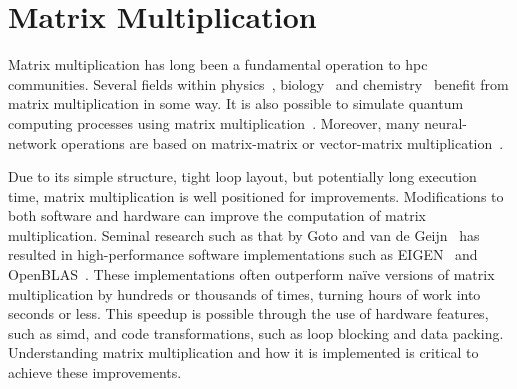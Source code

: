 \documentclass[\main/thesis.tex]{subfiles}
\begin{document}
\chapter{Matrix Multiplication}
\label{cha:matmul}
Matrix multiplication has long been a fundamental operation to \gls{hpc} communities.
Several fields within physics~\autocite{krol2014matrix}, biology~\autocite{akutsu2000algorithms} and chemistry~\autocite{weber2015semiempirical} benefit from matrix multiplication in some way.
It is also possible to simulate quantum computing processes using matrix multiplication~\autocite{zulehner2019matrix}.
Moreover, many neural-network operations are based on matrix-matrix or vector-matrix multiplication~\autocite{rojas1996neural,blue1992training}.

Due to its simple structure, tight loop layout, but potentially long execution time, matrix multiplication is well positioned for improvements.
Modifications to both software and hardware can improve the computation of matrix multiplication.
Seminal research such as that by Goto and van de Geijn~\autocite{goto2008anatomy} has resulted in high-performance software implementations such as EIGEN~\autocite{guennebaud2021eigen} and OpenBLAS~\autocite{xianyi2012model}.
These implementations often outperform na\"ive versions of matrix multiplication by hundreds or thousands of times, turning hours of work into seconds or less.
This speedup is possible through the use of hardware features, such as \gls{simd}, and code transformations, such as loop blocking and data packing.
Understanding matrix multiplication and how it is implemented is critical to achieve these improvements.
\end{document}

